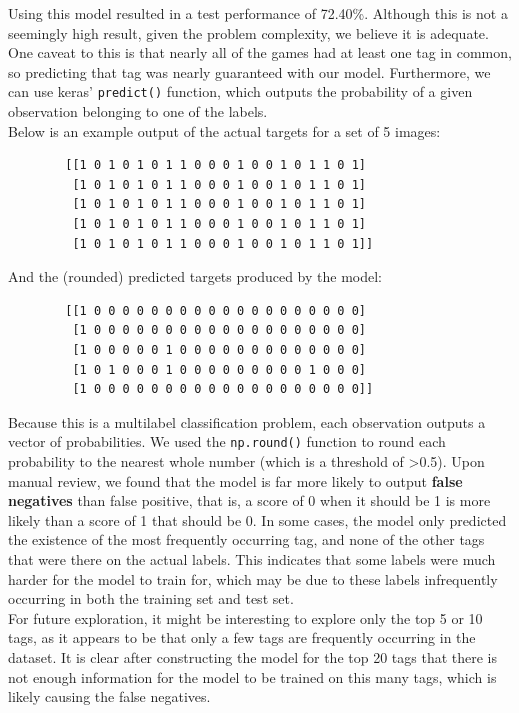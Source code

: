 \documentclass{article}
\begin{document}
Using this model resulted in a test performance of 72.40\%. Although this is not a seemingly high result, given the problem complexity, we believe it is adequate. One caveat to this is that nearly all of the games had at least one tag in common, so predicting that tag was nearly guaranteed with our model. Furthermore, we can use keras' \verb|predict()| function, which outputs the probability of a given observation belonging to one of the labels. \\

Below is an example output of the actual targets for a set of 5 images:
\begin{verbatim}
        [[1 0 1 0 1 0 1 1 0 0 0 1 0 0 1 0 1 1 0 1]
         [1 0 1 0 1 0 1 1 0 0 0 1 0 0 1 0 1 1 0 1]
         [1 0 1 0 1 0 1 1 0 0 0 1 0 0 1 0 1 1 0 1]
         [1 0 1 0 1 0 1 1 0 0 0 1 0 0 1 0 1 1 0 1]
         [1 0 1 0 1 0 1 1 0 0 0 1 0 0 1 0 1 1 0 1]]
\end{verbatim}
And the (rounded) predicted targets produced by the model:
\begin{verbatim}
        [[1 0 0 0 0 0 0 0 0 0 0 0 0 0 0 0 0 0 0 0]
         [1 0 0 0 0 0 0 0 0 0 0 0 0 0 0 0 0 0 0 0]
         [1 0 0 0 0 0 1 0 0 0 0 0 0 0 0 0 0 0 0 0]
         [1 0 1 0 0 0 1 0 0 0 0 0 0 0 0 0 1 0 0 0]
         [1 0 0 0 0 0 0 0 0 0 0 0 0 0 0 0 0 0 0 0]]
\end{verbatim}

Because this is a multilabel classification problem, each observation outputs a vector of probabilities. We used the \verb|np.round()| function to round each probability to the nearest whole number (which is a threshold of >0.5). Upon manual review, we found that the model is far more likely to output \textbf{false negatives} than false positive, that is, a score of 0 when it should be 1 is more likely than a score of 1 that should be 0. In some cases, the model only predicted the existence of the most frequently occurring tag, and none of the other tags that were there on the actual labels. This indicates that some labels were much harder for the model to train for, which may be due to these labels infrequently occurring in both the training set and test set. \\



For future exploration, it might be interesting to explore only the top 5 or 10 tags, as it appears to be that only a few tags are frequently occurring in the dataset. It is clear after constructing the model for the top 20 tags that there is not enough information for the model to be trained on this many tags, which is likely causing the false negatives.
\end{document}
